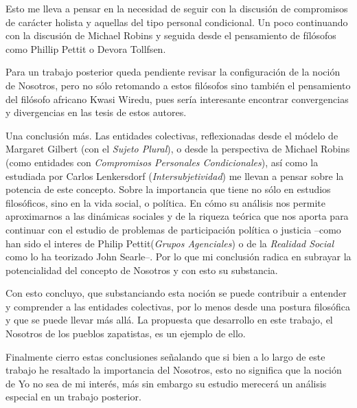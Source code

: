 \documentclass[oneside]{book}
\begin{document}
Esto me lleva a pensar en la necesidad de seguir con la discusión de compromisos de carácter holista y aquellas del tipo personal condicional. Un poco continuando con la discusión de Michael Robins y seguida desde el pensamiento de fílósofos como Phillip Pettit o Devora Tollfsen. 

Para un trabajo posterior queda pendiente revisar la configuración de la noción de Nosotros, pero no sólo retomando a estos filósofos sino también el pensamiento del filósofo africano Kwasi Wiredu, pues sería interesante encontrar convergencias y divergencias en las tesis de estos autores. 

Una conclusión más. Las entidades colectivas, reflexionadas desde el módelo de Margaret Gilbert (con el \textit{Sujeto Plural}), o desde la perspectiva de Michael Robins (como entidades con \textit{Compromisos Personales Condicionales}), así como la estudiada por Carlos Lenkersdorf (\textit{Intersubjetividad}) me llevan a pensar sobre la potencia de este concepto. Sobre la importancia que tiene no sólo en estudios filosóficos, sino en la vida social, o política. En cómo su análisis nos permite aproximarnos a las dinámicas sociales y de la riqueza teórica que nos aporta para continuar con el estudio de problemas de participación política o justicia --como han sido el interes de Philip Pettit(\textit{Grupos Agenciales}) o de la \textit{Realidad Social} como lo ha teorizado John Searle--. Por lo que mi conclusión radica en subrayar la potencialidad del concepto de Nosotros y con esto su substancia.

Con esto concluyo, que substanciando esta noción se puede contribuir a entender y comprender a las entidades colectivas, por lo menos desde una postura filosófica y que se puede llevar más allá. La propuesta que desarrollo en este trabajo, el Nosotros de los pueblos zapatistas, es un ejemplo de ello.

Finalmente cierro estas conclusiones señalando que si bien a lo largo de este trabajo he resaltado la importancia del Nosotros, esto no significa que la noción de Yo no sea de mi interés, más sin embargo su estudio merecerá un análisis especial en un trabajo posterior.
\end{document}

